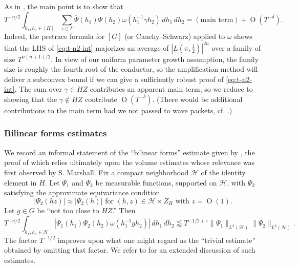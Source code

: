 \documentclass[reqno]{amsart}
\def\eps{\varepsilon}
\def\O{\operatorname{O}}
\theoremstyle{plain} \newtheorem{theorem} {Theorem}
\theoremstyle{definition} \newtheorem{definition} [theorem] {Definition}
\theoremstyle{itplain} %
\numberwithin{equation}{section}
\numberwithin{theorem}{section}
\begin{document}
As in \cite[\S1.5.3]{2020arXiv201202187N}, the main point is to show that
\begin{equation}\label{eq:t-n2-int}
  T^{-n/2} \int _{h_1, h_2 \in [H]} \sum _{\gamma \in \Gamma } \bar{\Psi}(h_1) \Psi(h_2) \omega(h_1^{-1} \gamma h_2) \, d h_1 \, d h_2
  = (\text{main term}) + \O(T^{-\delta}).
\end{equation}
Indeed, the pretrace formula for $[G]$ (or Cauchy--Schwarz) applied to $\omega$ shows that the LHS of \eqref{eq:t-n2-int} majorizes an average of $|L(\pi,\tfrac{1}{2})|^{2 n}$ over a family of size $T^{n(n+1)/2}$.  In view of our uniform parameter growth assumption, the family size is roughly the fourth root of the conductor, so the amplification method will deliver a subconvex bound if we can give a sufficiently robust proof of \eqref{eq:t-n2-int}.  The sum over $\gamma \in H Z$ contributes an apparent main term, so we reduce to showing that the $\gamma \notin H Z$ contribute $\O(T^{-\delta})$.  (There would be additional contributions to the main term had we not passed to wave packets, cf. \cite{MR2200997}.)


\subsubsection{Bilinear forms estimates}
We record an informal statement of the ``bilinear forms'' estimate given by \cite[Thm 15.1]{2020arXiv201202187N}, the proof of which relies ultimately upon the volume estimates \cite[\S16--17]{2020arXiv201202187N} whose relevance was first observed by S. Marshall.  Fix a compact neighborhood $\mathcal{H}$ of the identity element in $H$.  Let $\Psi_1$ and $\Psi_2$ be measurable functions, supported on $\mathcal{H}$, with $\Psi_2$ satisfying the approximate equivariance condition
\begin{equation*}
  |\Psi_2(h z)| \approx |\Psi_2(h)| \text{ for } (h,z) \in \mathcal{H} \times Z_H  \text{ with } z = \O(1).
\end{equation*}
Let $g \in G$ be ``not too close to $H Z$.''  Then
\begin{equation}\label{eq:t-n2-int-1}
  T^{-n/2} \int _{h_1, h_2 \in \mathcal{H} }
  \left\lvert
    \Psi_1(h_1) \Psi_2(h_2)
    \omega(h_1^{-1} g h_2) \right\rvert \, d h_1 \, d h_2
  \lessapprox
  T^{-1/2 + \eps}
  \|\Psi_1\|_{L^2(\mathcal{H})}
  \|\Psi_2\|_{L^2(\mathcal{H})}.
\end{equation}
The factor $T^{-1/2}$ improves upon what one might regard as the ``trivial estimate'' obtained by omitting that factor.  We refer to \cite[\S1.5.3--1.5.7, \S2.9--2.11]{2020arXiv201202187N} for an extended discussion of such estimates.
\end{document}

